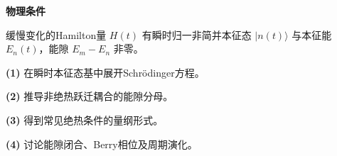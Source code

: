 \textbf{物理条件}\par 缓慢变化的Hamilton量 \(H(t)\) 有瞬时归一非简并本征态 \(|n(t)\rangle\) 与本征能 \(E_n(t)\)，能隙 \(E_m-E_n\) 非零。
\par\noindent\textbf{(1)} 在瞬时本征态基中展开Schrödinger方程。
\par\noindent\textbf{(2)} 推导非绝热跃迁耦合的能隙分母。
\par\noindent\textbf{(3)} 得到常见绝热条件的量纲形式。
\par\noindent\textbf{(4)} 讨论能隙闭合、Berry相位及周期演化。
